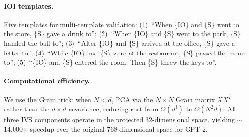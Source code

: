 \documentclass{article}
\begin{document}
\paragraph{IOI templates.}
Five templates for multi-template validation:
(1)~``When \{IO\} and \{S\} went to the store, \{S\} gave a drink to'';
(2)~``When \{IO\} and \{S\} went to the park, \{S\} handed the ball to'';
(3)~``After \{IO\} and \{S\} arrived at the office, \{S\} gave a letter to'';
(4)~``While \{IO\} and \{S\} were at the restaurant, \{S\} passed the menu to'';
(5)~``\{IO\} and \{S\} entered the room. Then \{S\} threw the keys to''.

\paragraph{Computational efficiency.}
We use the Gram trick: when $N < d$, PCA via the $N \times N$ Gram matrix $XX^T$ rather than the $d \times d$ covariance, reducing cost from $O(d^3)$ to $O(N^2 d)$. All three IVS components operate in the projected 32-dimensional space, yielding $\sim$14,000$\times$ speedup over the original 768-dimensional space for GPT-2.
\end{document}
